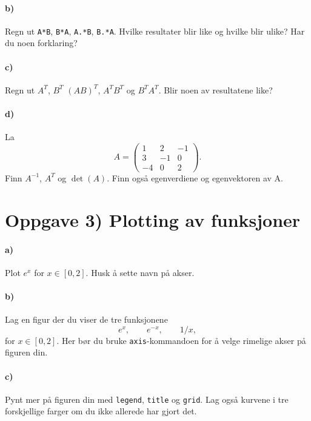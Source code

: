 \documentclass[a4paper, 11pt, notitlepage, english]{article}
\begin{document}
\paragraph{b)}
Regn ut \verb+A*B+, \verb+B*A+, \verb+A.*B+, \verb+B.*A+. Hvilke resultater blir like og hvilke blir ulike? Har du noen forklaring?

\paragraph{c)}
Regn ut $A^T$, $B^T$ $(AB)^T$, $A^T B^T$ og $B^T A^T$. Blir noen av resultatene like? 

\paragraph{d)}
La 
$$A = \begin{pmatrix}
	1 & 2 & -1 \\ 3 & -1 & 0 \\ -4 & 0 & 2
\end{pmatrix}.$$
Finn $A^{-1}$, $A^{T}$ og $\det(A)$. Finn også egenverdiene og egenvektoren av A.
 
\clearpage

\section*{Oppgave 3) Plotting av funksjoner}
\paragraph{a)}
Plot $e^x$ for $x\in[0,2]$. Husk å sette navn på akser.

\paragraph{b)}
Lag en figur der du viser de tre funksjonene
$$e^x, \qquad e^{-x}, \qquad 1/x,$$
for $x\in[0,2]$. Her bør du bruke \verb+axis+-kommandoen for å velge rimelige akser på figuren din.

\paragraph{c)}
Pynt mer på figuren din med \verb+legend+, \verb+title+ og \verb+grid+. Lag også kurvene i tre forskjellige farger om du ikke allerede har gjort det.
\end{document}
